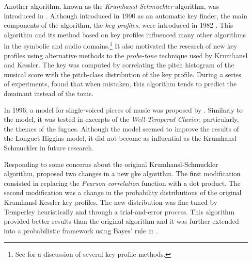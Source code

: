 Another algorithm, known as the \emph{Krumhansl-Schmuckler}
algorithm, was introduced in
\textcite{krumhansl1990cognitive}. Although introduced in
1990 as an automatic key finder, the main components of the
algorithm, the \emph{key profiles}, were introduced in 1982
\parencite{krumhansl1982tracing}. This algorithm and its
method based on key profiles influenced many other
algorithms in the symbolic and audio domains.\footnote{See
\textcite{napoleslopez2019keyfinding} for a discussion of
several key profile methods.} It also motivated the research
of new key profiles using alternative methods to the
\emph{probe-tone} technique used by Krumhansl and Kessler.
The key was computed by correlating the pitch histogram of
the musical score with the pitch-class distribution of the
key profile. During a series of experiments,
\textcite{sapp2011computational} found that when mistaken,
this algorithm tends to predict the dominant instead of the
tonic.

In 1996, a model for single-voiced pieces of music was
proposed by \textcite{vos1996parallelprocessing}. Similarly
to the \textcite{longuethiggins1971interpreting} model, it
was tested in excerpts of the \emph{Well-Tempered Clavier},
particularly, the themes of the fugues. Although the model
seemed to improve the results of the Longuet-Higgins model,
it did not become as influential as the Krumhansl-Schmuckler
in future research.

Responding to some concerns about the original
Krumhansl-Schmuckler algorithm,
\textcite{temperley1999whats} proposed two changes in a new
\gls{gke} algorithm. The first modification consisted in
replacing the \emph{Pearson correlation} function with a dot
product. The second modification was a change in the
probability distributions of the original Krumhansl-Kessler
key profiles. The new distribution was fine-tuned by
Temperley heuristically and through a trial-and-error
process. This algorithm provided better results than the
original algorithm and it was further extended into a
probabilistic framework using Bayes' rule in
\textcite{temperley2002bayesian}.



